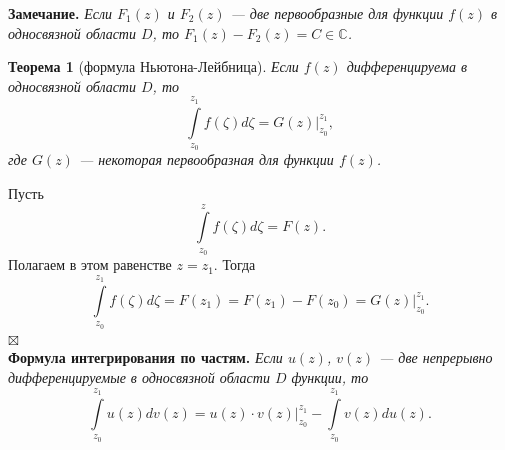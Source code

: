 \documentclass[a4paper, 12pt]{article}
\newenvironment{Proof} %
{\par\noindent{$\blacklozenge$}} %
{\hfill$\scriptstyle\boxtimes$}
\newcommand{\Cm}{\mathbb{C}}
\newtheorem*{theorem}{Теорема}
\begin{document}
\textbf{Замечание.} \textit{Если $F_1(z)$ и $F_2(z)$ --- две первообразные для функции $f(z)$ в односвязной области $D$, то $F_1(z) - F_2(z) = C\in \Cm$.}
\begin{theorem}
	[формула Ньютона-Лейбница]
	Если $f(z)$ дифференцируема в односвязной области $D$, то $$\int\limits_{z_0}^{z_1}f(\zeta)d\zeta = G(z) \Big| _{z_0}^{z_1},$$ где $G(z)$ --- некоторая первообразная для функции $f(z)$.
\end{theorem}\begin{Proof}
Пусть $$\int\limits_{z_0}^{z}f(\zeta)d\zeta = F(z).$$
Полагаем в этом равенстве $z = z_1$. Тогда $$\int\limits_{z_0}^{z_1}f(\zeta)d\zeta = F(z_1) = F(z_1) - F(z_0) =  G(z) \Big| _{z_0}^{z_1}.$$
\end{Proof}\\
\textbf{Формула интегрирования по частям.} \textit{Если $u(z)$, $v(z)$ --- две непрерывно дифференцируемые в односвязной области $D$ функции, то} $$\int\limits_{z_0}^{z_1}u(z)dv(z) = u(z)\cdot v(z)\Big| _{z_0}^{z_1} - \int\limits_{z_0}^{z_1}v(z)du(z).$$
\end{document}

